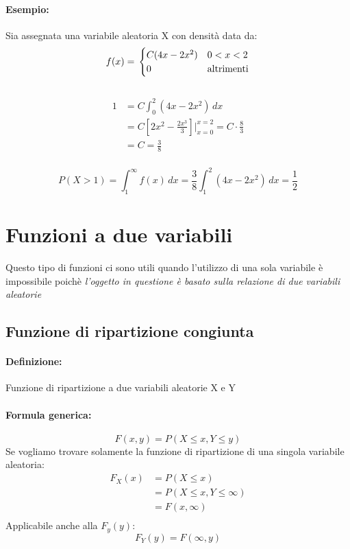 \documentclass[]{article}
\newcommand{\definizione}{\paragraph{Definizione:}}
\newcommand{\formula}{\paragraph{Formula generica:}}
\begin{document}
    \paragraph{Esempio:} Sia assegnata una variabile aleatoria X con densità data da:
    \begin{equation*}
        f(x) = \\
        \begin{cases}
            C(4x - 2x^2) & 0 < x < 2 \\
            0 & \text{altrimenti}
        \end{cases}
    \end{equation*}
     \\
    \linebreak[4]
    \begin{equation*}
        \begin{split}
            1 & = C \int_{0}^{2} (4x - 2x^2) \, dx\\
            & = C[2x^2 - \frac{2x^3}{3}] \bigg\rvert_{x=0}^{x=2} = C \cdot \frac{8}{3} \\
            & = C = \frac{3}{8}
        \end{split}
    \end{equation*} \\
    \linebreak[4]
    \[ P(X > 1) = \int_{1}^{\infty} f(x) \, dx = \frac{3}{8} \int_{1}^{2}(4x - 2x^2) \, dx = \frac{1}{2} \]
    \newpage

    \section{Funzioni a due variabili}
    Questo tipo di funzioni ci sono utili quando l'utilizzo di una sola variabile è impossibile poichè 
    \textit{l'oggetto in questione è basato sulla relazione di due variabili aleatorie}
    \subsection{Funzione di ripartizione congiunta}
    \definizione Funzione di ripartizione a due variabili aleatorie X e Y
    \formula \[ F(x, y) = P(X \leq x, Y \leq y) \]
    Se vogliamo trovare solamente la funzione di ripartizione di una singola variabile aleatoria:
    \begin{equation*}
    \begin{split}
        F_X(x) & = P(X \leq x) \\
        & = P(X \leq x, Y \leq \infty) \\
        & = F(x, \infty) \\
    \end{split}
    \end{equation*}
    Applicabile anche alla $F_y(y)$:
    \[ F_Y(y) = F(\infty, y) \]
\end{document}
